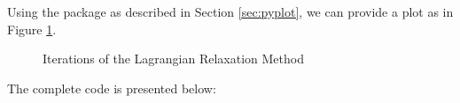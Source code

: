 Using the  package as described in Section \ref{sec:pyplot}, we can provide a plot as in Figure \ref{fig:iterations}.

\begin{figure}
\caption{Iterations of the Lagrangian Relaxation Method\label{fig:iterations}}
\end{figure}

The complete code is presented below:
\begin{codelisting}
\end{codelisting}
